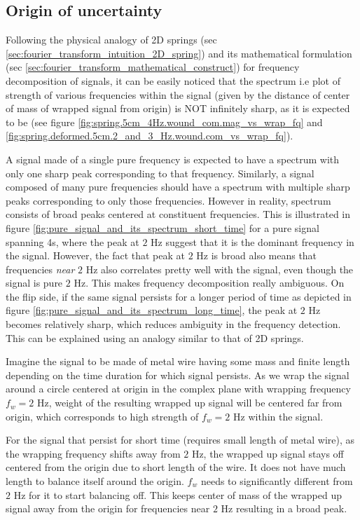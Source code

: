 \documentclass[11pt, a4paper]{article}
\begin{document}
	\subsection{Origin of uncertainty}\label{sec:fourier_transform_intuitive_origin_of_uncertainty}
	Following the physical analogy of 2D springs (sec \ref{sec:fourier_transform_intuition_2D_spring}) and its mathematical formulation (sec \ref{sec:fourier_transform_mathematical_construct}) for frequency decomposition of signals, it can be easily noticed that the spectrum i.e plot of strength of various frequencies within the signal (given by the distance of center of mass of wrapped signal from origin) is NOT infinitely sharp, as it is expected to be (see figure \ref{fig:spring.5cm_4Hz.wound_com.mag_vs_wrap_fq} and \ref{fig:spring.deformed.5cm.2_and_3_Hz.wound.com_vs_wrap_fq}). 
	
	A signal made of a single pure frequency is expected to have a spectrum with only one sharp peak corresponding to that frequency. Similarly, a signal composed of many pure frequencies should have a spectrum with multiple sharp peaks corresponding to only those frequencies. However in reality, spectrum consists of broad peaks centered at constituent frequencies. This is illustrated in figure \ref{fig:pure_signal_and_its_spectrum_short_time} for a pure signal spanning 4s, where the peak at $2$ Hz suggest that it is the dominant frequency in the signal. However, the fact that peak at $2$ Hz is broad also means that frequencies \textit{near} $2$ Hz also correlates pretty well with the signal, even though the signal is pure $2$ Hz. This makes frequency decomposition really ambiguous. On the flip side, if the same signal persists for a longer period of time as depicted in figure \ref{fig:pure_signal_and_its_spectrum_long_time}, the peak at $2$ Hz becomes relatively sharp, which reduces ambiguity in the frequency detection. This can be explained using an analogy similar to that of 2D springs.
	
	Imagine the signal to be made of metal wire having some mass and finite length depending on the time duration for which signal persists. As we wrap the signal around a circle centered at origin in the complex plane with wrapping frequency $f_{w} = 2$ Hz, weight of the resulting wrapped up signal will be centered far from origin, which corresponds to high strength of $f_{w} = 2$ Hz within the signal.
	
	For the signal that persist for short time (requires small length of metal wire), as the wrapping frequency shifts away from $2$ Hz, the wrapped up signal stays off centered from the origin due to short length of the wire. It does not have much length to balance itself around the origin. $f_{w}$ needs to significantly different from $2$ Hz for it to start balancing off. This keeps center of mass of the wrapped up signal away from the origin for frequencies near $2$ Hz resulting in a broad peak. 
	
\end{document}
